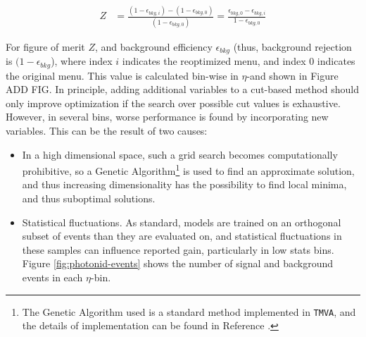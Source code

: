 \begin{align}
    Z &= \frac{(1-\epsilon_{bkg,i}) - (1-\epsilon_{bkg,0})}{(1-\epsilon_{bkg,0})} = \frac{\epsilon_{bkg,0} - \epsilon_{bkg,i}}{1-\epsilon_{bkg,0}}
    \label{eqn:improvement-metric}
\end{align}

For figure of merit $Z$, and background efficiency $\epsilon_{bkg}$ (thus, background rejection is $(1-\epsilon_{bkg}$), where index $i$ indicates the reoptimized menu, and index $0$ indicates the original menu. This value is calculated bin-wise in $\eta$-\pt and shown in Figure ADD FIG. In principle, adding additional variables to a cut-based method should only improve optimization if the search over possible cut values is exhaustive. However, in several bins, worse performance is found by incorporating new variables. This can be the result of two causes:
\begin{itemize}
    \item In a high dimensional space, such a grid search becomes computationally prohibitive, so a Genetic Algorithm\footnote{The Genetic Algorithm used is a standard method implemented in \texttt{TMVA}, and the details of implementation can be found in Reference \cite{TMVA}.} \cite{genetic-algo} is used to find an approximate solution, and thus increasing dimensionality has the possibility to find local minima, and thus suboptimal solutions.
    \item Statistical fluctuations. As standard, models are trained on an orthogonal subset of events than they are evaluated on, and statistical fluctuations in these samples can influence reported gain, particularly in low stats bins. Figure \ref{fig:photonid-events} shows the number of signal and background events in each $\eta$-\pt bin.
\end{itemize}

